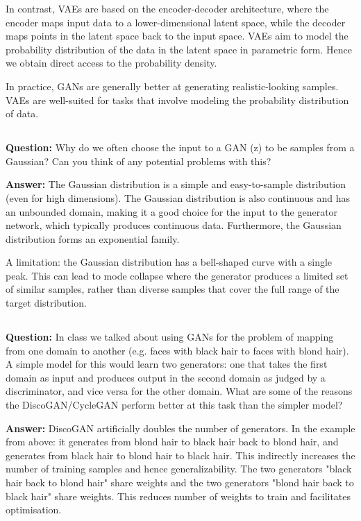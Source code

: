 \documentclass{article}
\begin{document}
In contrast, VAEs are based on the encoder-decoder architecture, where the encoder maps input data to a lower-dimensional latent space, while the decoder maps points in the latent space back to the input space. VAEs aim to model the probability distribution of the data in the latent space in parametric form. Hence we obtain direct access to the probability density.

In practice, GANs are generally better at generating realistic-looking samples. VAEs are well-suited for tasks that involve modeling the probability distribution of data. 

\subsection{}
\textbf{Question: } Why do we often choose the input to a GAN (z) to be samples from a Gaussian? Can you think of any potential problems with this?

\textbf{Answer:}
The Gaussian distribution is a simple and easy-to-sample distribution (even for high dimensions). The Gaussian distribution is also continuous and has an unbounded domain, making it a good choice for the input to the generator network, which typically produces continuous data. Furthermore, the Gaussian distribution forms an exponential family. 

A limitation: the Gaussian distribution has a bell-shaped curve with a single peak. This can lead to mode collapse where the generator produces a limited set of similar samples, rather than diverse samples that cover the full range of the target distribution.

 
\subsection{}
\textbf{Question: } In class we talked about using GANs for the problem of mapping from one domain to another (e.g. faces with black hair to faces with blond hair). A simple model for this would learn two generators: one that takes the first domain as input and produces output in the second domain as judged by a discriminator, and vice versa for the other domain. What are some of the reasons the DiscoGAN/CycleGAN perform better at this task than the simpler model?

\textbf{Answer:}
DiscoGAN artificially doubles the number of generators. In the example from above: it generates from blond hair to black hair back to blond hair, and generates from black hair to blond hair to black hair. This indirectly increases the number of training samples and hence generalizability. The two generators "black hair back to blond hair" share weights and the two generators "blond hair back to black hair" share weights. This reduces number of weights to train and facilitates optimisation.  
\end{document}
